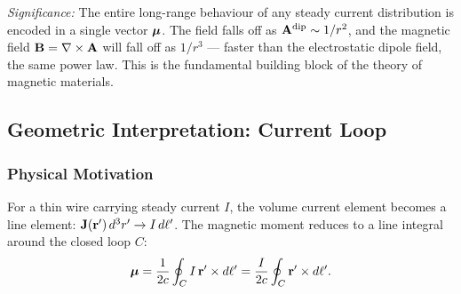

\textit{Significance:} The entire long-range behaviour of any steady current
distribution is encoded in a single vector $\boldsymbol{\mu}$.  The field falls off as
$\mathbf{A}^{\rm dip}\sim 1/r^2$, and the magnetic field $\mathbf{B}=\nabla\times\mathbf{A}$
will fall off as $1/r^3$ — faster than the electrostatic dipole field, the same
power law.  This is the fundamental building block of the theory of magnetic materials.


\subsection{Geometric Interpretation: Current Loop}\label{subsec:lec15-loop}

\subsubsection*{Physical Motivation}

For a thin wire carrying steady current $I$, the volume current element becomes a
line element: $\mathbf{J}(\mathbf{r}')\,d^3r' \to I\,d\mathbf{\ell}'$.  The magnetic moment
reduces to a line integral around the closed loop $C$:
\begin{equation}\label{eq:lec15-bmu-loop-raw}
  \boldsymbol{\mu} = \frac{1}{2c}\oint_C I\,\mathbf{r}'\times d\mathbf{\ell}'
       = \frac{I}{2c}\oint_C \mathbf{r}'\times d\mathbf{\ell}'.
\end{equation}

